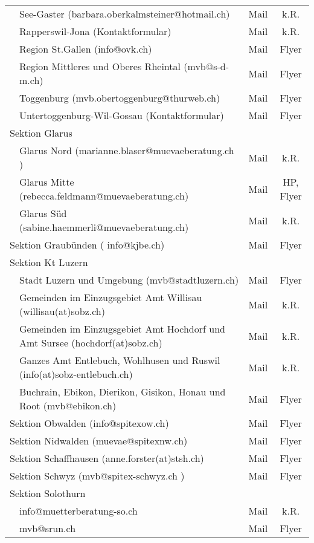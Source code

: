 \begin{longtable}[htbp]{|p{0.2em} p{20em} | c | c |}
  & See-Gaster (barbara.oberkalmsteiner@hotmail.ch) & Mail & k.R.\\
  & Rapperswil-Jona (Kontaktformular) & Mail & k.R.\\
  & Region St.Gallen (info@ovk.ch) & Mail & Flyer\\
  & Region Mittleres und Oberes Rheintal (mvb@s-d-m.ch) & Mail & Flyer\\
  & Toggenburg (mvb.obertoggenburg@thurweb.ch) & Mail & Flyer\\
  & Untertoggenburg-Wil-Gossau (Kontaktformular) & Mail & Flyer\\
  \multicolumn{2}{|l|}{Sektion Glarus} &  & \\
  & Glarus Nord (marianne.blaser@muevaeberatung.ch ) & Mail & k.R.\\
  & Glarus Mitte (rebecca.feldmann@muevaeberatung.ch) & Mail & HP, Flyer\\
  & Glarus Süd (sabine.haemmerli@muevaeberatung.ch) & Mail & k.R.\\
  \multicolumn{2}{|l|}{Sektion Graubünden ( info@kjbe.ch)} & Mail & Flyer\\
  \multicolumn{2}{|l|}{Sektion Kt Luzern} & & \\
  & Stadt Luzern und Umgebung (mvb@stadtluzern.ch) & Mail & Flyer\\
  & Gemeinden im Einzugsgebiet Amt Willisau (willisau(at)sobz.ch) & Mail & k.R.\\
  & Gemeinden im Einzugsgebiet Amt Hochdorf und Amt Sursee (hochdorf(at)sobz.ch) & Mail & k.R.\\
  & Ganzes Amt Entlebuch, Wohlhusen und Ruswil (info(at)sobz-entlebuch.ch) & Mail & k.R.\\
  & Buchrain, Ebikon, Dierikon, Gisikon, Honau und Root (mvb@ebikon.ch) & Mail & Flyer\\
  \multicolumn{2}{|l|}{Sektion Obwalden (info@spitexow.ch)} & Mail & Flyer\\
  \multicolumn{2}{|l|}{Sektion Nidwalden (muevae@spitexnw.ch)} & Mail & Flyer\\
  \multicolumn{2}{|l|}{Sektion Schaffhausen (anne.forster(at)stsh.ch)} & Mail & Flyer\\
  \multicolumn{2}{|l|}{Sektion Schwyz (mvb@spitex-schwyz.ch )} & Mail & Flyer\\
  \multicolumn{2}{|l|}{Sektion Solothurn} &  & \\
  & info@muetterberatung-so.ch & Mail & k.R.\\
  & mvb@srun.ch & Mail & Flyer\\

\end{longtable}
